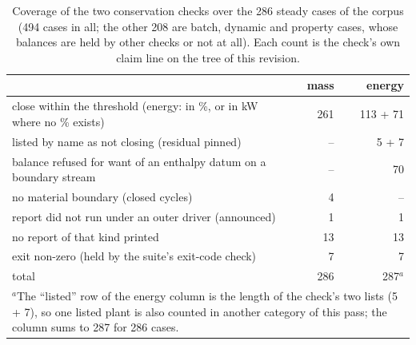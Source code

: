 \documentclass[preprint,12pt]{elsarticle}
\begin{document}
\begin{table}[t]
\centering\scriptsize
\caption{Coverage of the two conservation checks over the 286 steady cases
of the corpus (494 cases in all; the other 208 are batch, dynamic and
property cases, whose balances are held by other checks or not at all).
Each count is the check's own claim line on the tree of this revision.}
\label{tab:coverage}
\begin{tabular}{p{8.4cm}rr}
\toprule
& \textbf{mass} & \textbf{energy} \\
\midrule
close within the threshold (energy: in \%, or in kW where no \% exists)
  & 261 & 113 + 71 \\
listed by name as not closing (residual pinned) & -- & 5 + 7 \\
balance refused for want of an enthalpy datum on a boundary stream
  & -- & 70 \\
no material boundary (closed cycles) & 4 & -- \\
report did not run under an outer driver (announced) & 1 & 1 \\
no report of that kind printed & 13 & 13 \\
exit non-zero (held by the suite's exit-code check) & 7 & 7 \\
\midrule
total & 286 & 287$^{a}$ \\
\bottomrule
\multicolumn{3}{p{12.6cm}}{\footnotesize $^{a}$The ``listed'' row of the
energy column is the length of the check's two lists (5 + 7), so one listed
plant is also counted in another category of this pass; the column sums to
287 for 286 cases.}
\end{tabular}
\end{table}
\end{document}
